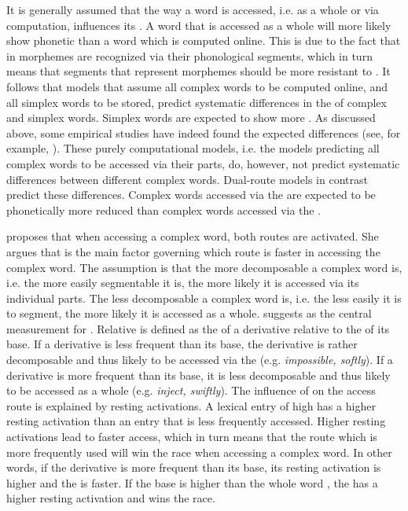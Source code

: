 {It is generally assumed that the way a word is accessed, i.e. as a whole or via computation, influences its . A word that is accessed as a whole will more likely show phonetic  than a word which is computed online.  This is due to the fact that in  morphemes are recognized via their phonological segments, which in turn means that segments that represent morphemes should be more resistant to . It follows that models that assume all complex words to be computed online, and all simplex words to be stored, predict systematic differences in the  of complex and simplex words. Simplex words are expected to show more . As discussed above, some empirical studies have indeed found the expected differences (see, for example, \citealt{Cho.2001,Sugahara.2009,Smith.2012}).
These purely computational models, i.e. the models predicting all complex words to be accessed via their parts,  do, however, not predict systematic differences between different complex words. Dual-route models in contrast predict these differences. Complex words accessed via the   are expected to be phonetically more reduced than complex words accessed via the .



\cite{Hay.2001,Hay.2003} proposes that when accessing a complex word, both routes are activated. She argues that  is the main factor governing  which route is faster in accessing the complex word. The assumption is that the more decomposable a complex word is, i.e. the more easily segmentable it is, the more likely it is accessed via its individual parts. The less decomposable a complex word is, i.e.  the less easily it is to segment, the more likely it is accessed as a whole. \cite{Hay.2001,Hay.2003} suggests  as the central measurement for . Relative  is defined as the  of a derivative relative to the  of its base. If a derivative is less frequent than its base, the derivative is rather decomposable and thus likely to be accessed via the  (e.g. \textit{impossible, softly}).  If a derivative is more frequent than its base, it is less decomposable and thus likely to be accessed as a whole (e.g. \textit{inject, swiftly}). 
The influence of  on the access route is explained by resting activations. A lexical entry of high  has a higher resting activation than an entry that is less frequently accessed. Higher resting activations lead to faster access, which in turn means that the route which is more frequently used will win the race when accessing a complex word. In other words, if the derivative is more frequent than its base, its resting activation is higher and the  is faster. If the base  is higher than the whole word , the  has a higher resting activation and wins the race.


}
